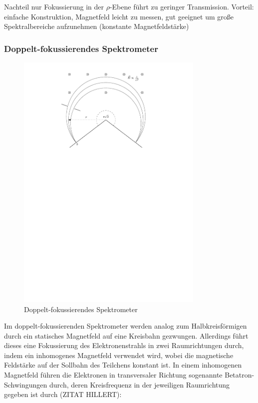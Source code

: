 \documentclass[11pt, a4paper]{article}
\numberwithin{equation}{section}
\begin{document}
Nachteil nur Fokussierung in der $\rho$-Ebene führt zu geringer Transmission.
Vorteil: einfache Konstruktion, Magnetfeld leicht zu messen, gut geeignet um große Spektralbereiche aufzunehmen (konstante Magnetfeldstärke)

\subsubsection{Doppelt-fokussierendes Spektrometer}
\begin{figure}[h]
	\centering
	\includegraphics[width=0.8\textwidth]{./figures/pisqrt2_spectrometer.pdf}
	\caption{Doppelt-fokussierendes Spektrometer}
	\label{fig:pisqrt2_spectro}
\end{figure}
Im doppelt-fokussierenden Spektrometer werden analog zum Halbkreisförmigen durch ein statisches Magnetfeld auf eine Kreisbahn gezwungen.
Allerdings führt dieses eine Fokussierung des Elektronenstrahls in zwei Raumrichtungen durch, indem ein inhomogenes Magnetfeld verwendet wird, wobei die magnetische Feldstärke auf der Sollbahn des Teilchens konstant ist.
In einem inhomogenen Magnetfeld führen die Elektronen in transversaler Richtung sogenannte Betatron-Schwingungen durch, deren Kreisfrequenz in der jeweiligen Raumrichtung gegeben ist durch (ZITAT HILLERT):
\end{document}
